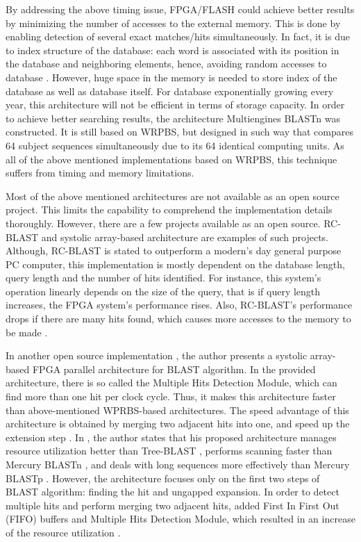        
By addressing the above timing issue, FPGA/FLASH \cite{lavenier2007reconfigurable} could achieve better results by minimizing the number of accesses to the external memory. This is done by enabling detection of several exact matches/hits simultaneously. In fact, it is due to index structure of the database: each word is associated with its position in the database and neighboring elements, hence, avoiding random accesses to database \cite{guo2012systolic}. However, huge space in the memory is needed to store index of the database as well as database itself. For database exponentially growing every year, this architecture will not be efficient in terms of storage capacity. In order to achieve better searching results, the architecture Multiengines BLASTn \cite{sotiriades2007design} was constructed. It is still based on WRPBS, but designed in such way that compares 64 subject sequences simultaneously due to its 64 identical computing units. As all of the above mentioned implementations based on WRPBS, this technique suffers from timing and memory limitations. 


Most of the above mentioned architectures are not available as an open source project. This limits the capability to comprehend the implementation details thoroughly. However, there are a few projects available as an open source. RC-BLAST \cite{datta2009} and  systolic array-based architecture\cite{guo2012open} are examples of such projects. Although, RC-BLAST is stated to outperform a modern's day general purpose PC computer, this implementation is mostly dependent on the database length, query length and the number of hits identified. For instance, this system's operation linearly depends on the size of the query, that is if query length increases, the FPGA system's performance rises. Also, RC-BLAST's performance drops if there are many hits found, which causes more accesses to the memory to be made \cite{datta2009}.

In another open source implementation \cite{guo2012open}, the author presents a systolic array-based FPGA parallel architecture for BLAST algorithm. In the provided architecture, there is so called the Multiple Hits Detection Module, which can find more than one hit per clock cycle. Thus, it makes this architecture faster than above-mentioned WPRBS-based architectures. The speed advantage of this architecture is obtained by merging two adjacent hits into one, and speed up the extension step \cite{guo2012open}. In \cite{guo2012open}, the author states that his proposed architecture manages resource utilization better than Tree-BLAST \cite{herbordt2006single}, performs scanning faster than Mercury BLASTn \cite{buhler2007mercury}, and deals with long sequences more effectively than Mercury BLASTp \cite{harris2007banded}. However, the architecture focuses only on the first two steps of BLAST algorithm: finding the hit and ungapped expansion. In order to detect multiple hits and perform merging two adjacent hits, \cite{guo2012open} added First In First Out (FIFO) buffers and Multiple Hits Detection Module, which resulted in an increase of the resource utilization \cite{guo2012open}.


